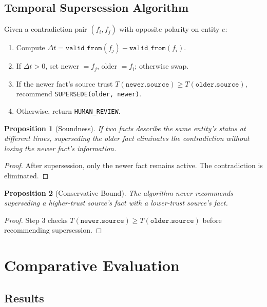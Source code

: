 \documentclass{article}
\newtheorem{proposition}{Proposition}
\begin{document}
\subsection{Temporal Supersession Algorithm}
\label{alg:supersede}

Given a contradiction pair $(f_i, f_j)$ with opposite polarity on entity $e$:

\begin{enumerate}
\item Compute $\Delta t = \texttt{valid\_from}(f_j) - \texttt{valid\_from}(f_i)$.
\item If $\Delta t > 0$, set newer $= f_j$, older $= f_i$; otherwise swap.
\item If the newer fact's source trust $T(\texttt{newer.source}) \geq T(\texttt{older.source})$, recommend \texttt{SUPERSEDE(older, newer)}.
\item Otherwise, return \texttt{HUMAN\_REVIEW}.
\end{enumerate}

\begin{proposition}[Soundness]
If two facts describe the same entity's status at different times, superseding the older fact eliminates the contradiction without losing the newer fact's information.
\end{proposition}

\begin{proof}
After supersession, only the newer fact remains active. The contradiction is eliminated.
\end{proof}

\begin{proposition}[Conservative Bound]
The algorithm never recommends superseding a higher-trust source's fact with a lower-trust source's fact.
\end{proposition}

\begin{proof}
Step 3 checks $T(\texttt{newer.source}) \geq T(\texttt{older.source})$ before recommending supersession.
\end{proof}

\section{Comparative Evaluation}
\label{sec:eval}

\subsection{Results}
\end{document}
